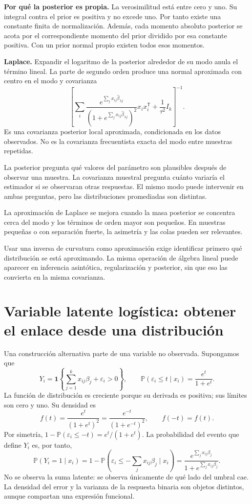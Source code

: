 \documentclass[11pt,a4paper]{article}
\newcommand{\Prob}{\mathbb P}
\newcommand{\T}{^{\mathsf T}}
\begin{document}
\textbf{Por qué la posterior es propia.}
La verosimilitud está entre cero y uno.
Su integral contra el prior es positiva y no excede uno.
Por tanto existe una constante finita de normalización.
Además, cada momento absoluto posterior se acota por
el correspondiente momento del prior dividido por
esa constante positiva.
Con un prior normal propio existen todos esos momentos.

\textbf{Laplace.}
Expandir el logaritmo de la posterior alrededor de
su modo anula el término lineal.
La parte de segundo orden produce una normal aproximada
con centro en el modo y covarianza
\[
\left[
\sum_i
\frac{e^{\sum_jx_{ij}\widehat\beta_{\lambda j}}}
{(1+e^{\sum_jx_{ij}\widehat\beta_{\lambda j}})^2}x_ix_i\T
+\frac1{\tau^2}I_k
\right]^{-1}.
\]
Es una covarianza posterior local aproximada,
condicionada en los datos observados.
No es la covarianza frecuentista exacta del modo
entre muestras repetidas.

\begin{ejemplo}
La posterior pregunta qué valores del parámetro
son plausibles después de observar una muestra.
La covarianza muestral pregunta cuánto variaría el
estimador si se observaran otras respuestas.
El mismo modo puede intervenir en ambas preguntas,
pero las distribuciones promediadas son distintas.
\end{ejemplo}
La aproximación de Laplace se mejora cuando la masa
posterior se concentra cerca del modo y los términos
de orden mayor son pequeños.
En muestras pequeñas o con separación fuerte,
la asimetría y las colas pueden ser relevantes.

Usar una inversa de curvatura como aproximación
exige identificar primero qué distribución se está
aproximando.
La misma operación de álgebra lineal puede aparecer
en inferencia asintótica, regularización y posterior,
sin que eso las convierta en la misma covarianza.

\clearpage
\section{Variable latente logística: obtener el enlace desde una distribución}\label{logit70}
Una construcción alternativa parte de una variable no observada.
Supongamos que
\[
Y_i=\mathbf1\left\{\sum_{j=1}^kx_{ij}\beta_j+\varepsilon_i>0\right\},
\qquad
\Prob(\varepsilon_i\le t\mid x_i)=\frac{e^t}{1+e^t}.
\]
La función de distribución es creciente porque su derivada es positiva;
sus límites son cero y uno. Su densidad es
\[
f(t)=\frac{e^t}{(1+e^t)^2}
=\frac{e^{-t}}{(1+e^{-t})^2},\qquad f(-t)=f(t).
\]
Por simetría, \(1-\Prob(\varepsilon_i\le -t)=e^t/(1+e^t)\).
La probabilidad del evento que define \(Y_i\) es, por tanto,
\[
\Prob(Y_i=1\mid x_i)
=1-\Prob\left(\varepsilon_i\le-\sum_jx_{ij}\beta_j\mid x_i\right)
=\frac{e^{\sum_jx_{ij}\beta_j}}{1+e^{\sum_jx_{ij}\beta_j}}.
\]
No se observa la suma latente: se observa únicamente de qué lado
del umbral cae. La densidad del error y la varianza de la respuesta
binaria son objetos distintos, aunque compartan una expresión funcional.
\end{document}
